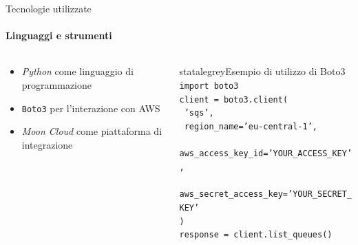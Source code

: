 \documentclass{beamer}
\begin{document}
\begin{frame}{Tecnologie utilizzate}
    \framesubtitle{Linguaggi e strumenti}
    \begin{columns}
        \begin{column}{0.4\textwidth}
            \begin{itemize}
                \item \emph{Python} come linguaggio di programmazione
                \item \texttt{Boto3} per l'interazione con AWS
                \item \emph{Moon Cloud} come piattaforma di integrazione
            \end{itemize}
        \end{column}
        \begin{column}{0.6\textwidth}
            \begin{colorblock}[black]{statalegrey}{Esempio di utilizzo di Boto3}
                \texttt{\textcolor{maincolor}{import} boto3}\\
                \texttt{client = boto3.\textcolor{maincolor}{client}(}\\
                \texttt{    \textcolor{statalegreen}{'sqs'},}\\
                \texttt{    region\_name=\textcolor{statalegreen}{'eu-central-1'},}\\
                \texttt{    aws\_access\_key\_id=\textcolor{statalegreen}{'YOUR\_ACCESS\_KEY'},}\\
                \texttt{    aws\_secret\_access\_key=\textcolor{statalegreen}{'YOUR\_SECRET\_KEY'}}\\
                \texttt{)}\\
                \texttt{response = client.\textcolor{maincolor}{list\_queues}()}\\
            \end{colorblock}
        \end{column}
    \end{columns}
\end{frame}
\end{document}
